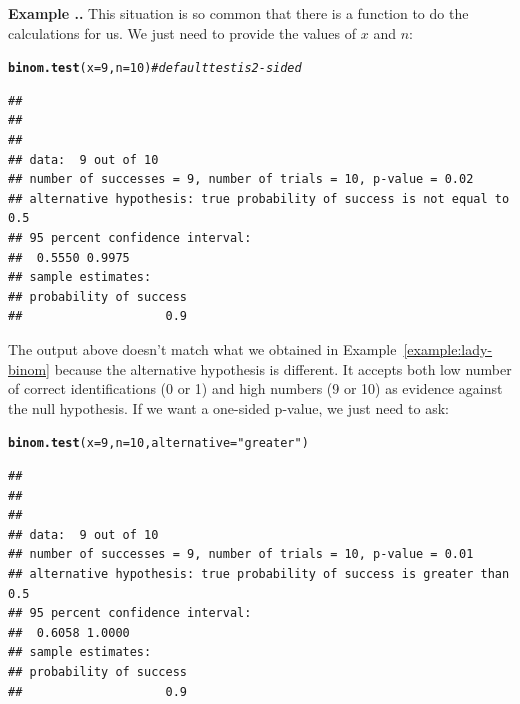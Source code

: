 \documentclass[twoside]{book}\usepackage[]{graphicx}\usepackage[]{xcolor}
\makeatletter
\newcommand{\hlnum}[1]{\textcolor[rgb]{0.686,0.059,0.569}{#1}}%
\newcommand{\hlstr}[1]{\textcolor[rgb]{0.192,0.494,0.8}{#1}}%
\newcommand{\hlcom}[1]{\textcolor[rgb]{0.678,0.584,0.686}{\textit{#1}}}%
\newcommand{\hlstd}[1]{\textcolor[rgb]{0.345,0.345,0.345}{#1}}%
\newcommand{\hlkwc}[1]{\textcolor[rgb]{0.333,0.667,0.333}{#1}}%
\newcommand{\hlkwd}[1]{\textcolor[rgb]{0.737,0.353,0.396}{\textbf{#1}}}%
\newenvironment{kframe}{%
 \def\at@end@of@kframe{}%
 \ifinner\ifhmode%
  \def\at@end@of@kframe{\end{minipage}}%
  \begin{minipage}{\columnwidth}%
 \fi\fi%
 \def\FrameCommand##1{\hskip\@totalleftmargin \hskip-\fboxsep
 \colorbox{shadecolor}{##1}\hskip-\fboxsep
     \hskip-\linewidth \hskip-\@totalleftmargin \hskip\columnwidth}%
 \MakeFramed {\advance\hsize-\width
   \@totalleftmargin\z@ \linewidth\hsize
   \@setminipage}}%
 {\par\unskip\endMakeFramed%
 \at@end@of@kframe}
\newenvironment{knitrout}{}{} %
\newcounter{example}[section]
\newenvironment{example}%
{\refstepcounter{example}%
\textbf{Example \thesection.\arabic{example}. }}%
{}
\makeatother
\begin{document}
\begin{example}
	This situation is so common that there is a function to do the calculations for us.
	We just need to provide the values of $x$ and $n$:
\begin{knitrout}
\color{fgcolor}\begin{kframe}
\begin{alltt}
\hlkwd{binom.test}\hlstd{(}\hlkwc{x} \hlstd{=} \hlnum{9}\hlstd{,} \hlkwc{n} \hlstd{=} \hlnum{10}\hlstd{)}           \hlcom{# default test is 2-sided}
\end{alltt}
\begin{verbatim}
## 
## 
## 
## data:  9 out of 10
## number of successes = 9, number of trials = 10, p-value = 0.02
## alternative hypothesis: true probability of success is not equal to 0.5
## 95 percent confidence interval:
##  0.5550 0.9975
## sample estimates:
## probability of success 
##                    0.9
\end{verbatim}
\end{kframe}
\end{knitrout}
	The output above doesn't match what we obtained in Example~\ref{example:lady-binom}
	because the alternative hypothesis is different.  It accepts both low number of correct
	identifications (0 or 1) and high numbers (9 or 10) as evidence against the null
	hypothesis.  If we want a one-sided p-value, we just need to ask:
\begin{knitrout}
\color{fgcolor}\begin{kframe}
\begin{alltt}
\hlkwd{binom.test}\hlstd{(}\hlkwc{x} \hlstd{=} \hlnum{9}\hlstd{,} \hlkwc{n} \hlstd{=} \hlnum{10}\hlstd{,} \hlkwc{alternative} \hlstd{=} \hlstr{"greater"}\hlstd{)}
\end{alltt}
\begin{verbatim}
## 
## 
## 
## data:  9 out of 10
## number of successes = 9, number of trials = 10, p-value = 0.01
## alternative hypothesis: true probability of success is greater than 0.5
## 95 percent confidence interval:
##  0.6058 1.0000
## sample estimates:
## probability of success 
##                    0.9
\end{verbatim}
\end{kframe}
\end{knitrout}
\begin{center}
\begin{tabular}{r|r}

\end{tabular}
\end{center}
\end{example}
\end{document}
